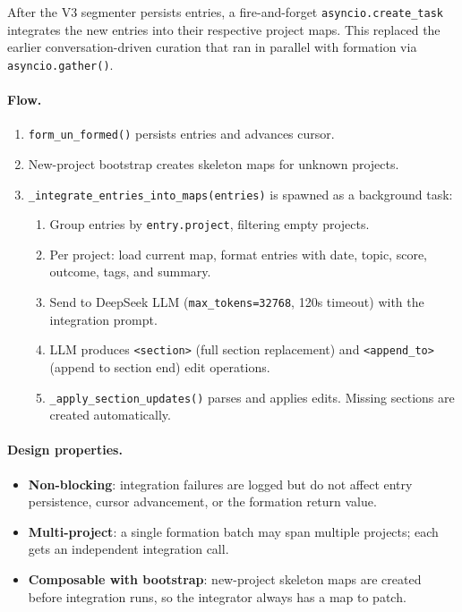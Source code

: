 \documentclass[11pt,a4paper]{article}
\newcommand{\code}[1]{\texttt{#1}}
\begin{document}
After the V3 segmenter persists entries, a fire-and-forget
\code{asyncio.create\_task} integrates the new entries into their
respective project maps. This replaced the earlier conversation-driven
curation that ran in parallel with formation via
\code{asyncio.gather()}.

\paragraph{Flow.}
\begin{enumerate}[nosep]
  \item \code{form\_un\_formed()} persists entries and advances cursor.
  \item New-project bootstrap creates skeleton maps for unknown projects.
  \item \code{\_integrate\_entries\_into\_maps(entries)} is spawned as a
        background task:
  \begin{enumerate}[nosep]
    \item Group entries by \code{entry.project}, filtering empty projects.
    \item Per project: load current map, format entries with date,
          topic, score, outcome, tags, and summary.
    \item Send to DeepSeek LLM (\code{max\_tokens=32768}, 120s timeout)
          with the integration prompt.
    \item LLM produces \code{<section>} (full section replacement) and
          \code{<append\_to>} (append to section end) edit operations.
    \item \code{\_apply\_section\_updates()} parses and applies edits.
          Missing sections are created automatically.
  \end{enumerate}
\end{enumerate}

\paragraph{Design properties.}
\begin{itemize}[nosep]
  \item \textbf{Non-blocking}: integration failures are logged but do
        not affect entry persistence, cursor advancement, or the
        formation return value.
  \item \textbf{Multi-project}: a single formation batch may span
        multiple projects; each gets an independent integration call.
  \item \textbf{Composable with bootstrap}: new-project skeleton maps
        are created before integration runs, so the integrator always
        has a map to patch.
\end{itemize}
\end{document}
